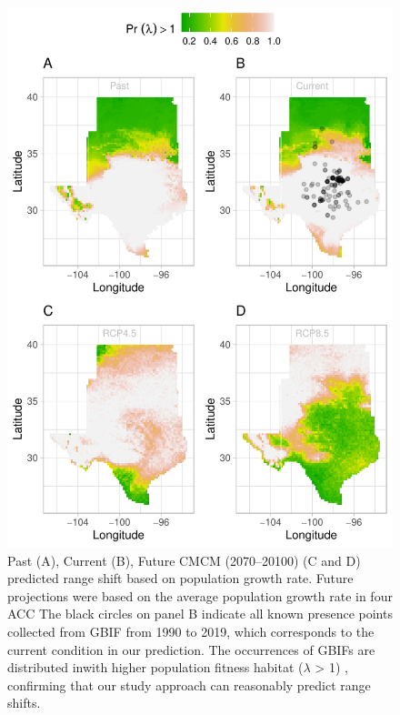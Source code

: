 \documentclass[12pt]{article}
\begin{document}
\begin{figure}[H]
  \begin{center}
    \includegraphics[width=0.78\linewidth]{Figures/Fig_geoPrlambdaprojection_fd_miroc.pdf}
  \caption{Past (A), Current (B), Future CMCM (2070–20100) (C and D) predicted range shift based on population growth rate. Future projections were based on the average population growth rate in four ACC The black circles on panel B indicate all known presence points collected from GBIF from 1990 to 2019, which corresponds to the current condition in our prediction.  The occurrences of GBIFs are distributed inwith higher population fitness habitat ($\lambda$ > 1) , confirming that our study approach can reasonably predict range shifts. }
  \label{Sup:geopromirocfd}
  \end{center}
\end{figure}
\end{document}
